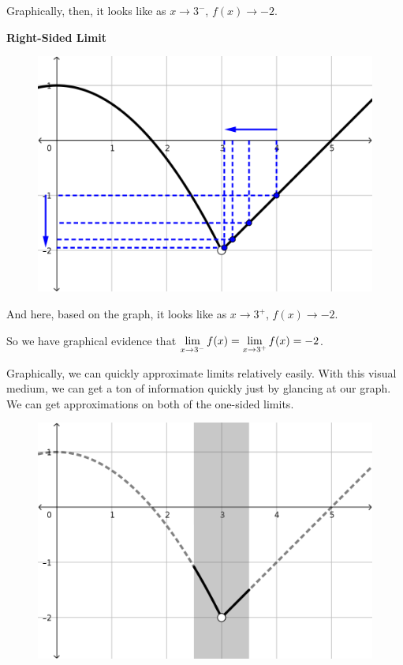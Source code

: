 Graphically, then, it looks like as $x\to 3^-$, $f(x) \to -2$.

\textbf{Right-Sided Limit}

\begin{figure}[h!tb]
  \includegraphics[scale=0.75]{./1_limits/images/1-1_graph1R.png}
  \centering
\end{figure}

And here, based on the graph, it looks like as $x\to 3^+$, $f(x)\to -2$.

So we have graphical evidence that $\displaystyle \lim_{x\to 3^-} f(x) = \displaystyle \lim_{x\to 3^+} f(x) = -2$.

Graphically, we can quickly approximate limits relatively easily.
With this visual medium, we can get a ton of information quickly just by glancing at our graph.
We can get approximations on both of the one-sided limits.

\begin{figure}[h!tb]
  \includegraphics[scale=0.75]{./1_limits/images/1-1_graph1bar1.png}
  \centering
\end{figure}

